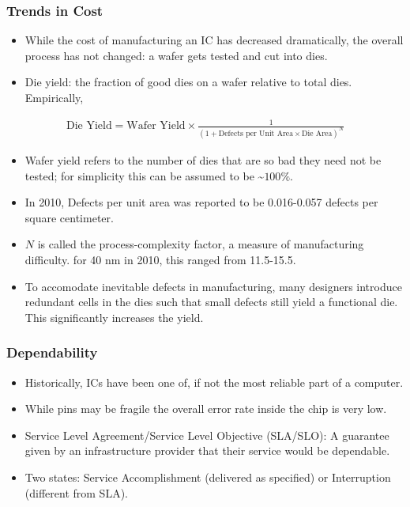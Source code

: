 \subsubsection{Trends in Cost}
\begin{itemize}
    \item While the cost of manufacturing an IC has decreased dramatically, the overall process has not changed: a wafer gets tested and cut into dies. 
    \item Die yield: the fraction of good dies on a wafer relative to total dies. Empirically,
\end{itemize}
\begin{align*}
    \text{Die Yield} = \text{Wafer Yield} \times \frac{1}{(1+\text{Defects per Unit Area} \times \text{Die Area})^N}
\end{align*}
\begin{itemize}
    \item Wafer yield refers to the number of dies that are so bad they need not be tested; for simplicity this can be assumed to be \textasciitilde$100\%$.
    \item In 2010, Defects per unit area was reported to be 0.016-0.057 defects per square centimeter.
    \item $N$ is called the process-complexity factor, a measure of manufacturing difficulty. for 40 nm in 2010, this ranged from 11.5-15.5.
    \item To accomodate inevitable defects in manufacturing, many designers introduce redundant cells in the dies such that small defects still yield a functional die. This significantly increases the yield.
\end{itemize}
\subsubsection{Dependability}
\begin{itemize}
    \item Historically, ICs have been one of, if not the most reliable part of a computer. 
    \item While pins may be fragile the overall error rate inside the chip is very low.
    \item Service Level Agreement/Service Level Objective (SLA/SLO): A guarantee given by an infrastructure provider that their service would be dependable. 
    \item Two states: Service Accomplishment (delivered as specified) or Interruption (different from SLA). 
\end{itemize}
